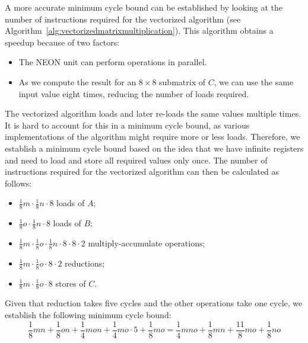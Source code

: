 \documentclass[11pt,a4paper]{report}
\theoremstyle{definition}
\begin{document}
A more accurate minimum cycle bound can be established by looking at the number of instructions required for the vectorized algorithm (see Algorithm~\ref{alg:vectorizedmatrixmultiplication}). This algorithm obtains a speedup because of two factors:
\begin{itemize}
  \item The NEON unit can perform operations in parallel.
  \item As we compute the result for an $8\times8$ submatrix of $C$, we can use the same input value eight times, reducing the number of loads required.
\end{itemize}
The vectorized algorithm loads and later re-loads the same values multiple times. It is hard to account for this in a minimum cycle bound, as various implementations of the algorithm might require more or less loads. Therefore, we establish a minimum cycle bound based on the idea that we have infinite registers and need to load and store all required values only once. The number of instructions required for the vectorized algorithm can then be calculated as follows:
\begin{itemize}
  \item $\frac{1}{8}m \cdot \frac{1}{8}n \cdot 8$ loads of $A$;
  \item $\frac{1}{8}o \cdot \frac{1}{8}n \cdot 8$ loads of $B$;
  \item $\frac{1}{8}m \cdot \frac{1}{8}o \cdot \frac{1}{8}n \cdot 8 \cdot 8 \cdot 2$ multiply-accumulate operations;
  \item $\frac{1}{8}m \cdot \frac{1}{8}o \cdot 8 \cdot 2$ reductions;
  \item $\frac{1}{8}m \cdot \frac{1}{8}o \cdot 8$ stores of $C$.
\end{itemize}
Given that reduction takes five cycles and the other operations take one cycle, we establish the following minimum cycle bound:
\[
  \frac{1}{8}mn + \frac{1}{8}on + \frac{1}{4}mon + \frac{1}{4}mo \cdot 5 + \frac{1}{8}mo = \frac{1}{4}mno + \frac{1}{8}mn + \frac{11}{8}mo + \frac{1}{8}no
\]

\end{document}
